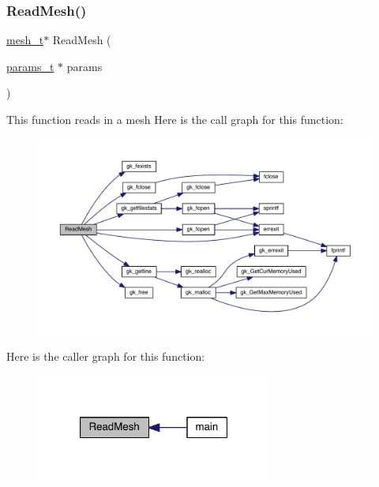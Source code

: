 \subsubsection{\texorpdfstring{Read\+Mesh()}{ReadMesh()}}
{\footnotesize\ttfamily \hyperlink{a00738}{mesh\+\_\+t}$\ast$ Read\+Mesh (\begin{DoxyParamCaption}\item[{\hyperlink{a00706}{params\+\_\+t} $\ast$}]{params }\end{DoxyParamCaption})}

This function reads in a mesh Here is the call graph for this function\+:\nopagebreak
\begin{figure}[H]
\begin{center}
\leavevmode
\includegraphics[width=350pt]{a00858_a1ce1ff57b84c6de0f3beb24b48bf9af9_cgraph}
\end{center}
\end{figure}
Here is the caller graph for this function\+:\nopagebreak
\begin{figure}[H]
\begin{center}
\leavevmode
\includegraphics[width=220pt]{a00858_a1ce1ff57b84c6de0f3beb24b48bf9af9_icgraph}
\end{center}
\end{figure}
\mbox{\label{a00858_a65a7c382444e5132dafddb75b6117754}} 
